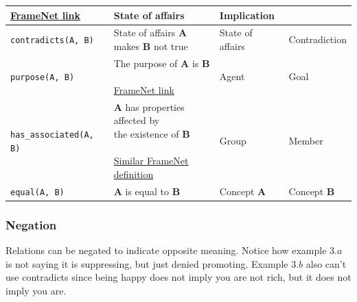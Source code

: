 \begin{footnotesize}
\begin{tabular}{lp{5cm}p{2.5cm}p{3cm}}
{\href{https://framenet2.icsi.berkeley.edu/fnReports/data/frameIndex.xml?frame=Evidence}
{FrameNet link}
}
& State of affairs & Implication \\
\midrule
\texttt{contradicts(A, B)} & 
\makecell[cl]{
State of affairs \textbf{A} \\
makes \textbf{B} not true}
& State of affairs & Contradiction \\
\midrule
\texttt{purpose(A, B)} & 
\makecell[cl]{The purpose of \textbf{A} is \textbf{B} \\\\
\href{https://framenet2.icsi.berkeley.edu/fnReports/data/frameIndex.xml?frame=Purpose
}{FrameNet link}
} & Agent & Goal \\
\midrule
\texttt{has\_associated(A, B)} &
\makecell[cl]{
\textbf{A} has properties affected by \\
the existence of \textbf{B} \\\\
\href{https://framenet2.icsi.berkeley.edu/fnReports/data/frameIndex.xml?frame=Membership
}
{Similar FrameNet definition} 
} & Group & Member \\
\midrule
\texttt{equal(A, B)} & \textbf{A} is equal to \textbf{B} & Concept \textbf{A} & Concept \textbf{B} \\
\bottomrule
\end{tabular}
\end{footnotesize}

\subsubsection*{Negation}

Relations can be negated to indicate opposite meaning. Notice how example $3.a$
is not saying it is suppressing, but just denied promoting. Example $3.b$ also can’t
use contradicts since being happy does not imply you are not rich, but it does
not imply you are.

